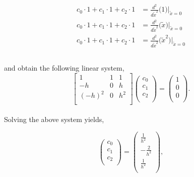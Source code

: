 \documentclass[paper=a4, fontsize=11pt]{scrartcl} %
\numberwithin{equation}{section} %
\numberwithin{figure}{section} %
\numberwithin{table}{section} %
\begin{document}
\begin{align}
\nonumber
\begin{split}
c_0\cdot 1                + c_1\cdot 1               + c_2\cdot 1           &= \frac{d^2}{d\tilde{x}^2} \bigg(1\bigg)\Big|_{\tilde{x}=0} \\
c_0\cdot 1                + c_1\cdot 1               + c_2\cdot 1           &= \frac{d^2}{d\tilde{x}^2} \bigg(\tilde{x}\bigg)\Big|_{\tilde{x}=0}  \\
c_0\cdot 1                + c_1\cdot 1               + c_2\cdot 1           &= \frac{d^2}{d\tilde{x}^2} \bigg(\tilde{x}^2\bigg)\Big|_{\tilde{x}=0}  \\
\end{split}
\end{align}\\

and obtain the following linear system, \\

$$\left[ \begin{array}{ccc}
1          &       1       &        1       \\
-h         &       0       &        h       \\
(-h)^2   &       0       &        h^2   \\
\end{array} \right] %
%
\left( \begin{array}{c}
c_0 \\
c_1 \\
c_2 \\
\end{array} \right) =  
%
\left( \begin{array}{c}
1 \\
0 \\
0 \\
\end{array} \right).$$\\

Solving the above system yields, 

$$\left( \begin{array}{c}
c_{0} \\
c_{1} \\
c_2 \\
\end{array} \right) = \left( \begin{array}{c}
\frac{1}{h^2} \\
-\frac{2}{h^2}  \\
\frac{1}{h^2}  \\
\end{array} \right),$$\\
\end{document}
